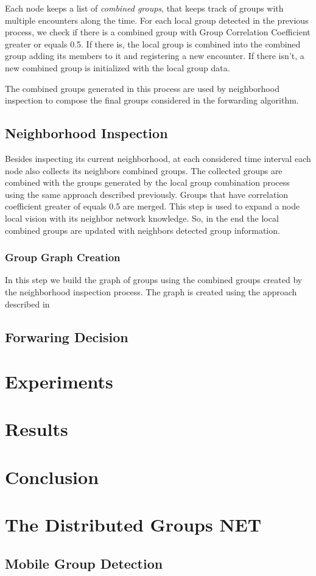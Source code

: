 Each node keeps a list of \textit{combined groups}, that keeps track of groups with multiple encounters along the time. For each
local group detected in the previous process, we check if there is a combined group with Group Correlation Coefficient greater or equals 0.5.
If there is, the local group is combined into the combined group adding its members to it and registering a new encounter. If there isn't, a new combined group is initialized with the local group data.

The combined groups generated in this process are used by neighborhood inspection to compose the final groups considered in the forwarding algorithm.

\subsection{Neighborhood Inspection}

Besides inspecting its current neighborhood, at each considered time interval each node also collects its neighbors combined groups. The collected groups are combined with the groups generated by the local group combination process using the same approach described previously. Groups that have correlation coefficient greater of equals 0.5 are merged. This step is used to expand a node local vision with its neighbor
network knowledge. So, in the end the local combined groups are updated with neighbors detected group information.

\subsubsection{Group Graph Creation}

In this step we build the graph of groups using the combined groups created by the neighborhood inspection process. The graph is created using the approach described in \cite{groupMobility}

\subsection{Forwaring Decision}
\label{subsec:forwardingDistGroupsNET}

\section{Experiments}
\label{sec:GNExperiments}

\section{Results}
\label{sec:GNResults}

\section{Conclusion}
\label{sec:GNConclusion}


\section{The Distributed Groups NET}



\subsection{Mobile Group Detection}



